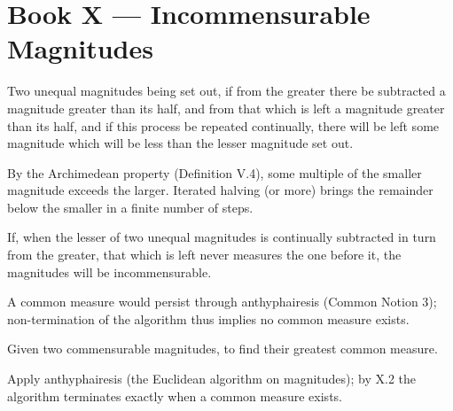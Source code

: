 %
%

\section{Book X --- Incommensurable Magnitudes}
\label{sec:book-X}

\begin{claim}
\label{prop:X.1}
Two unequal magnitudes being set out, if from the greater there be
subtracted a magnitude greater than its half, and from that which is
left a magnitude greater than its half, and if this process be
repeated continually, there will be left some magnitude which will be
less than the lesser magnitude set out.
\end{claim}
\begin{evidence}[Proof of X.1]
\label{ev:X.1}
By the Archimedean property (Definition V.4), some multiple of the
smaller magnitude exceeds the larger.  Iterated halving (or more)
brings the remainder below the smaller in a finite number of steps.
\end{evidence}

\begin{claim}
\label{prop:X.2}
If, when the lesser of two unequal magnitudes is continually
subtracted in turn from the greater, that which is left never
measures the one before it, the magnitudes will be incommensurable.
\end{claim}
\begin{evidence}[Proof of X.2]
\label{ev:X.2}
A common measure would persist through anthyphairesis (Common Notion
3); non-termination of the algorithm thus implies no common measure
exists.
\end{evidence}

\begin{claim}
\label{prop:X.3}
Given two commensurable magnitudes, to find their greatest common
measure.
\end{claim}
\begin{evidence}[Proof of X.3]
\label{ev:X.3}
Apply anthyphairesis (the Euclidean algorithm on magnitudes); by X.2
the algorithm terminates exactly when a common measure exists.
\end{evidence}

